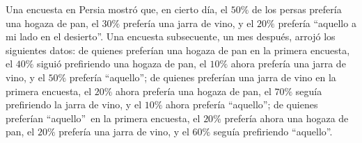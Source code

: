 \documentclass[12pt,a4paper]{book}
\begin{document}
    \begin{ejemplo}
        Una encuesta en Persia mostró que, en cierto día, el $50\%$ de los persas prefería una hogaza de pan, el $30\%$ prefería una jarra de vino, y el $20\%$ prefería \textquotedblleft aquello a mi lado en el desierto\textquotedblright. Una encuesta subsecuente, un mes después, arrojó los siguientes datos: de quienes preferían una hogaza de pan en la primera encuesta, el $40\%$ siguió prefiriendo una hogaza de pan, el $10\%$ ahora prefería una jarra de vino, y el $50\%$ prefería \textquotedblleft aquello\textquotedblright; de quienes preferían una jarra de vino en la primera encuesta, el $20\%$ ahora prefería una hogaza de pan, el $70\%$ seguía prefiriendo la jarra de vino, y el $10\%$ ahora prefería \textquotedblleft aquello\textquotedblright; de quienes preferían \textquotedblleft aquello\textquotedblright\ en la primera encuesta, el $20\%$ prefería ahora una hogaza de pan, el $20\%$ prefería una jarra de vino, y el $60\%$ seguía prefiriendo \textquotedblleft aquello\textquotedblright.


\end{ejemplo}
\end{document}
